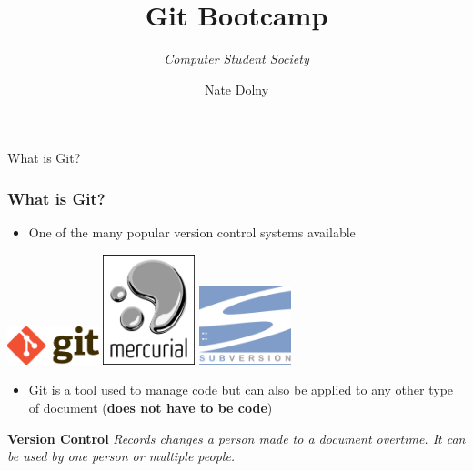 \documentclass{beamer}
\title{\textbf{Git Bootcamp}}
\subtitle{\textit{Computer Student Society}}
\author{Nate Dolny}
\date{}
\begin{document}
\begin{frame}
	\titlepage
\end{frame}

\begin{frame}{What is Git?}
	\frametitle{\textbf{What is Git?}}
	\begin{itemize}
		\item One of the many popular version control systems available
	\end{itemize}

	\begin{center}
		\includegraphics[width=0.2\textwidth]{img/Git-Logo.png} 
		\hspace{1cm}
		\includegraphics[width=0.2\textwidth]{img/Mercurial_logo.png} 
		\hspace{1cm}
		\includegraphics[width=0.2\textwidth]{img/Apache_Subversion_logo.png} 
		\hspace{1cm}
	\end{center}	

	\begin{itemize}
		\item Git is a tool used to manage code but can also be applied to any other 
type of document (\textbf{does not have to be code})
	\end{itemize}
	
	\begin{block}{\textbf{Version Control}}
		\textit{Records changes a person made to a document overtime. It can be used 
by one person or multiple people.}
	\end{block}
\end{frame}
\end{document}
